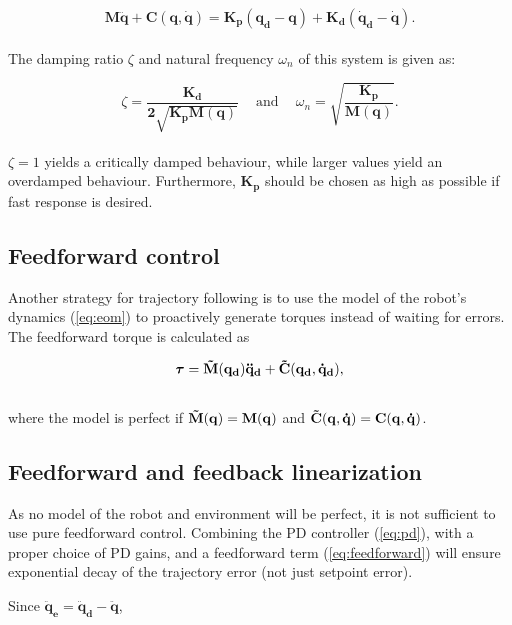 \begin{equation}\label{eq:control1}
    \mathbf{M \ddot{q} + C(q, \dot{q}) = K_p (q_d - q) + K_d (\dot{q}_d - \dot{q})}.
\end{equation}
\\
The damping ratio $\zeta$ and natural frequency $\omega_n$ of this system is given as:

\begin{equation}\label{eq:control2}
    \zeta = \mathbf{\frac{K_d}{2 \sqrt{K_p M(q)}}} \quad  \
    \textrm{and} \quad \
    \omega_n = \mathbf{\sqrt{\frac{K_p}{M(q)}}}.
\end{equation}
\\
$\zeta = 1$ yields a critically damped behaviour, while larger values yield an overdamped behaviour. Furthermore, $\mathbf{K_p}$ should be chosen as high as possible if fast response is desired.

\subsection{Feedforward control}
Another strategy for trajectory following is to use the model of the robot's dynamics (\ref{eq:eom}) to proactively generate torques instead of waiting for errors. The feedforward torque is calculated as 

\begin{equation}\label{eq:feedforward}
    \boldsymbol{\tau} = \mathbf{\Tilde{M}(q_d)\ddot{q}_d + \Tilde{C}(q_d, \dot{q}_d)},
\end{equation}
\\
where the model is perfect if $\mathbf{\Tilde{M}(q) = M(q)}$ and $\mathbf{\Tilde{C}(q,\dot{q}) = C(q,\dot{q})}$.


\subsection{Feedforward and feedback linearization} \label{subsec:comp_torque}

As no model of the robot and environment will be perfect, it is not sufficient to use pure feedforward control. Combining the PD controller (\ref{eq:pd}), with a proper choice of PD gains, and a feedforward term (\ref{eq:feedforward}) will ensure exponential decay of the trajectory error (not just setpoint error).

Since $\mathbf{\ddot{q}_e = \ddot{q}_d - \ddot{q}}$,

